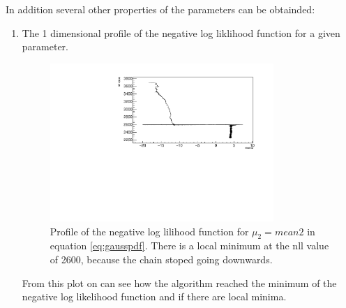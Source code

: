 \documentclass[english]{uzhpub}
\begin{document}
In addition several other properties of the parameters can be obtainded:
\begin{enumerate}
  \item The 1 dimensional profile of the negative log liklihood function for a given parameter.
  \begin{figure}[H]
    \centering
    \includegraphics[width=0.8\textwidth]{RooMCMC/walkProfile}
    \caption{Profile of the negative log lilihood function for $\mu_2 = mean2$ in equation \ref{eq:gausspdf}. There is a local minimum at the nll value of 2600, because the chain stoped going downwards.}
    \label{fig:profile}
  \end{figure}
  From this plot on can see how the algorithm reached the minimum of the negative log likelihood function and if there are local minima. \\



\end{enumerate}
\end{document}
